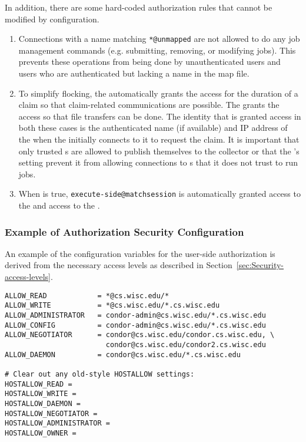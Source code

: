In addition, there are some hard-coded authorization rules that
 cannot be modified by configuration.
\begin{enumerate}

\item Connections with a name matching \verb|*@unmapped| are not
 allowed to do any job management commands (e.g. submitting, removing,
 or modifying jobs).  This prevents these operations from being done
 by unauthenticated users and users who are authenticated but lacking
 a name in the map file.

\item To simplify flocking, the  automatically grants
 the   access for the duration of a claim
 so that claim-related communications are possible.  The
  grants the   access so
 that file transfers can be done.  The identity that is granted access
 in both these cases is the authenticated name (if available) and IP
 address of the  when the  initially
 connects to it to request the claim.  It is important that only trusted
 s are allowed to publish themselves to the collector
 or that the 's  setting prevent
 it from allowing connections to s that it does not trust
 to run jobs.

\item When  is
 true, \verb|execute-side@matchsession| is automatically granted
  access to the  and 
 access to the .

\end{enumerate}

\subsubsection{\label{sec:Security-sample2} Example of Authorization Security Configuration}

An example of the configuration variables for the user-side
authorization is derived from the necessary access levels
as described in
Section~\ref{sec:Security-access-levels}.

\footnotesize
\begin{verbatim}
ALLOW_READ            = *@cs.wisc.edu/*
ALLOW_WRITE           = *@cs.wisc.edu/*.cs.wisc.edu
ALLOW_ADMINISTRATOR   = condor-admin@cs.wisc.edu/*.cs.wisc.edu
ALLOW_CONFIG          = condor-admin@cs.wisc.edu/*.cs.wisc.edu
ALLOW_NEGOTIATOR      = condor@cs.wisc.edu/condor.cs.wisc.edu, \
                        condor@cs.wisc.edu/condor2.cs.wisc.edu
ALLOW_DAEMON          = condor@cs.wisc.edu/*.cs.wisc.edu

# Clear out any old-style HOSTALLOW settings:
HOSTALLOW_READ =
HOSTALLOW_WRITE =
HOSTALLOW_DAEMON =
HOSTALLOW_NEGOTIATOR =
HOSTALLOW_ADMINISTRATOR =
HOSTALLOW_OWNER =
\end{verbatim}
\normalsize


